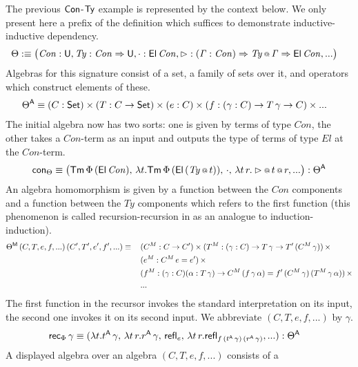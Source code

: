 \documentclass[acmsmall,review,anonymous]{acmart}\settopmatter{printfolios=true,printccs=false,printacmref=false}
\begin{document}
The previous $\mathsf{Con}$-$\mathsf{Ty}$ example is represented by the context below. We only present here a prefix of the definition which suffices to demonstrate inductive-inductive dependency.
\begin{alignat*}{5}
  & \Theta:\equiv\big(\mathit{Con}:\mathsf{U},\mathit{Ty}:\mathit{Con}\Rightarrow\mathsf{U},\cdot:\mathsf{El}\,\mathit{Con},\rhd:(\mathit{\Gamma}:\mathit{Con})\Rightarrow \mathit{Ty}\mathop{{\scriptstyle @}}\mathit{\Gamma}\Rightarrow\mathsf{El}\,\mathit{Con},...\big)
\end{alignat*}
Algebras for this signature consist of a set, a family of sets over
it, and operators which construct elements of these.
\begin{alignat*}{5}
  & \Theta^{\mathsf{A}}\equiv(C:\mathsf{Set})\times(T:C\rightarrow\mathsf{Set})\times(e:C)\times(f:(\mathit{\gamma}:C)\rightarrow T\,\mathit{\gamma}\rightarrow C)\times...
\end{alignat*}
The initial algebra now has two sorts: one is given by terms of
type $\mathit{Con}$, the other takes a $\mathit{Con}$-term as an input
and outputs the type of terms of type $\mathit{El}$ at the
$\mathit{Con}$-term.
\[
\mathsf{con}_\Theta \equiv \big(\mathsf{Tm}\,\Phi\,(\mathsf{El}\,\mathit{Con}),\, \lambda t.\mathsf{Tm}\,\Phi\,(\mathsf{El}\,(\mathit{Ty}\mathop{{\scriptstyle @}} t)),\, \cdot,\, \lambda t\,r.\rhd\mathop{{\scriptstyle @}} t\mathop{{\scriptstyle @}} r,...\big):\Theta^{\mathsf{A}}
\]
An algebra homomorphism is given by a function between the
$\mathit{Con}$ components and a function between the $\mathit{Ty}$
components which refers to the first function (this phenomenon is
called recursion-recursion in \cite{forsberg-phd} as an analogue to
induction-induction).
\begin{alignat*}{5}
  & \Theta^{\mathsf{M}}\,(C,T,e,f,...)\,(C',T',e',f',...)\equiv\, && (C^M:C\rightarrow C')\times(T^M:(\gamma:C)\rightarrow T\,\gamma\rightarrow T'\,(C^M\,\gamma))\,\times \\
  & && (e^M:C^M\,e=e')\,\times \\
  & && (f^M:(\gamma:C)(\alpha:T\,\gamma)\rightarrow C^M\,(f\,\gamma\,\alpha)=f'\,(C^M\,\gamma)\,(T^M\,\gamma\,\alpha))\,\times \\
  & && ...
\end{alignat*}
The first function in the recursor invokes the standard interpretation
on its input, the second one invokes it on its second input. We
abbreviate $(C,T,e,f,...)$ by $\gamma$.
\begin{alignat*}{5}
  & \mathsf{rec}_\Phi\,\gamma \equiv (\lambda t.t^{\mathsf{A}}\,\gamma,\, \lambda t\,r.r^{\mathsf{A}}\,\gamma,\, \mathsf{refl}_{e},\,\lambda t\,r.\mathsf{refl}_{f\,(t^{\mathsf{A}}\,\gamma)\,(r^{\mathsf{A}}\,\gamma)},...):\Theta^{\mathsf{A}}
\end{alignat*}
A displayed algebra over an algebra $(C,T,e,f,...)$ consists of a
\end{document}
